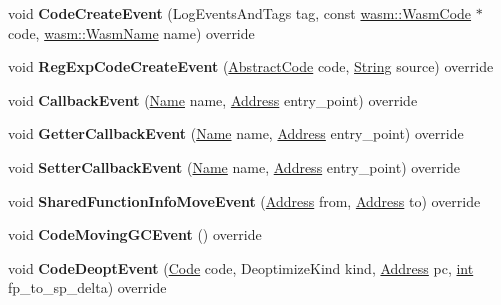 \begin{DoxyCompactItemize}
\item 
\mbox{\label{classv8_1_1internal_1_1CodeEventLogger_a2f215ba458139625c638ee81cc61f538}} 
void {\bfseries Code\+Create\+Event} (Log\+Events\+And\+Tags tag, const \mbox{\hyperlink{classv8_1_1internal_1_1wasm_1_1WasmCode}{wasm\+::\+Wasm\+Code}} $\ast$code, \mbox{\hyperlink{classv8_1_1internal_1_1Vector}{wasm\+::\+Wasm\+Name}} name) override
\item 
\mbox{\label{classv8_1_1internal_1_1CodeEventLogger_a21cc89e16e4bf4ce986603f89f4f91a3}} 
void {\bfseries Reg\+Exp\+Code\+Create\+Event} (\mbox{\hyperlink{classv8_1_1internal_1_1AbstractCode}{Abstract\+Code}} code, \mbox{\hyperlink{classv8_1_1internal_1_1String}{String}} source) override
\item 
\mbox{\label{classv8_1_1internal_1_1CodeEventLogger_a3d68b2bb85a4d36880f35cb7ecfc3b03}} 
void {\bfseries Callback\+Event} (\mbox{\hyperlink{classv8_1_1internal_1_1Name}{Name}} name, \mbox{\hyperlink{classuintptr__t}{Address}} entry\+\_\+point) override
\item 
\mbox{\label{classv8_1_1internal_1_1CodeEventLogger_aaed146e3101ec9da0f40d9b8041f4f13}} 
void {\bfseries Getter\+Callback\+Event} (\mbox{\hyperlink{classv8_1_1internal_1_1Name}{Name}} name, \mbox{\hyperlink{classuintptr__t}{Address}} entry\+\_\+point) override
\item 
\mbox{\label{classv8_1_1internal_1_1CodeEventLogger_af892b6e6d4c9f669c6a40ea0d40ea13f}} 
void {\bfseries Setter\+Callback\+Event} (\mbox{\hyperlink{classv8_1_1internal_1_1Name}{Name}} name, \mbox{\hyperlink{classuintptr__t}{Address}} entry\+\_\+point) override
\item 
\mbox{\label{classv8_1_1internal_1_1CodeEventLogger_aba57706aa2d5625494d9cf6182a0bf07}} 
void {\bfseries Shared\+Function\+Info\+Move\+Event} (\mbox{\hyperlink{classuintptr__t}{Address}} from, \mbox{\hyperlink{classuintptr__t}{Address}} to) override
\item 
\mbox{\label{classv8_1_1internal_1_1CodeEventLogger_a1e7773a2cbfc92976ed978cd58aacce3}} 
void {\bfseries Code\+Moving\+G\+C\+Event} () override
\item 
\mbox{\label{classv8_1_1internal_1_1CodeEventLogger_ab269993de8e58fbb49b8b900151643c8}} 
void {\bfseries Code\+Deopt\+Event} (\mbox{\hyperlink{classv8_1_1internal_1_1Code}{Code}} code, Deoptimize\+Kind kind, \mbox{\hyperlink{classuintptr__t}{Address}} pc, \mbox{\hyperlink{classint}{int}} fp\+\_\+to\+\_\+sp\+\_\+delta) override
\end{DoxyCompactItemize}
